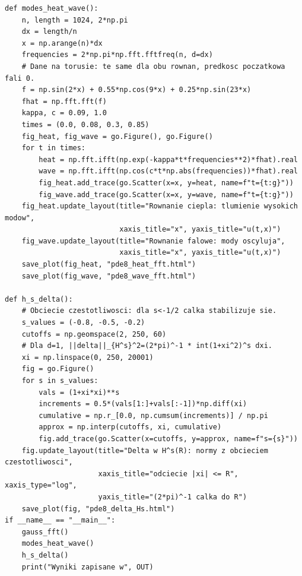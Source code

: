 \begin{lstlisting}[style=pythonpde,
caption={Transformata Gaussa, dyskretna tożsamość Parsevala, ewolucje spektralne oraz normy $H^s$ (Plotly)},
label={code:pde8-plotly}]
def modes_heat_wave():
    n, length = 1024, 2*np.pi
    dx = length/n
    x = np.arange(n)*dx
    frequencies = 2*np.pi*np.fft.fftfreq(n, d=dx)
    # Dane na torusie: te same dla obu rownan, predkosc poczatkowa fali 0.
    f = np.sin(2*x) + 0.55*np.cos(9*x) + 0.25*np.sin(23*x)
    fhat = np.fft.fft(f)
    kappa, c = 0.09, 1.0
    times = (0.0, 0.08, 0.3, 0.85)
    fig_heat, fig_wave = go.Figure(), go.Figure()
    for t in times:
        heat = np.fft.ifft(np.exp(-kappa*t*frequencies**2)*fhat).real
        wave = np.fft.ifft(np.cos(c*t*np.abs(frequencies))*fhat).real
        fig_heat.add_trace(go.Scatter(x=x, y=heat, name=f"t={t:g}"))
        fig_wave.add_trace(go.Scatter(x=x, y=wave, name=f"t={t:g}"))
    fig_heat.update_layout(title="Rownanie ciepla: tlumienie wysokich modow",
                           xaxis_title="x", yaxis_title="u(t,x)")
    fig_wave.update_layout(title="Rownanie falowe: mody oscyluja",
                           xaxis_title="x", yaxis_title="u(t,x)")
    save_plot(fig_heat, "pde8_heat_fft.html")
    save_plot(fig_wave, "pde8_wave_fft.html")

def h_s_delta():
    # Obciecie czestotliwosci: dla s<-1/2 calka stabilizuje sie.
    s_values = (-0.8, -0.5, -0.2)
    cutoffs = np.geomspace(2, 250, 60)
    # Dla d=1, ||delta||_{H^s}^2=(2*pi)^-1 * int(1+xi^2)^s dxi.
    xi = np.linspace(0, 250, 20001)
    fig = go.Figure()
    for s in s_values:
        vals = (1+xi*xi)**s
        increments = 0.5*(vals[1:]+vals[:-1])*np.diff(xi)
        cumulative = np.r_[0.0, np.cumsum(increments)] / np.pi
        approx = np.interp(cutoffs, xi, cumulative)
        fig.add_trace(go.Scatter(x=cutoffs, y=approx, name=f"s={s}"))
    fig.update_layout(title="Delta w H^s(R): normy z obcieciem czestotliwosci",
                      xaxis_title="odciecie |xi| <= R", xaxis_type="log",
                      yaxis_title="(2*pi)^-1 calka do R")
    save_plot(fig, "pde8_delta_Hs.html")
if __name__ == "__main__":
    gauss_fft()
    modes_heat_wave()
    h_s_delta()
    print("Wyniki zapisane w", OUT)
\end{lstlisting}

